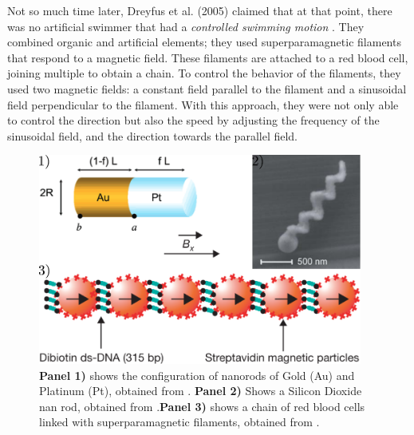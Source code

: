 Not so much time later, Dreyfus et al. (2005) claimed that at that point, there was no artificial swimmer that had a \textit{controlled swimming motion} \cite{dreyfus2005microscopic}. They combined organic and artificial elements; they used superparamagnetic filaments that respond to a magnetic field. These filaments are attached to a red blood cell, joining multiple to obtain a chain. To control the behavior of the filaments, they used two magnetic fields: a constant field parallel to the filament and a sinusoidal field perpendicular to the filament. With this approach, they were not only able to control the direction but also the speed by adjusting the frequency of the sinusoidal field, and the direction towards the parallel field.

\begin{figure}
  \begin{center}
    \includegraphics[width=0.95\textwidth]{figures/artificialExamples.pdf}
  \end{center}
  \caption[Artificail microswimmers]{\textbf{Panel 1)} shows the configuration of nanorods of Gold (Au) and Platinum (Pt), obtained from \cite{paxton2004catalytic}. \textbf{Panel 2)} Shows a Silicon Dioxide nan rod, obtained from \cite{ghosh2009controlled}.\textbf{Panel 3)} shows a chain of red blood cells linked with superparamagnetic filaments, obtained from \cite{dreyfus2005microscopic}.}\label{fig:artificialexamples}
\end{figure}


